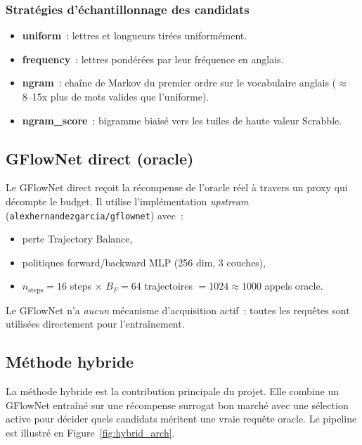 \documentclass[10pt]{article}
\begin{document}
\subsubsection{Stratégies d'échantillonnage des candidats}

\begin{itemize}[noitemsep]
  \item \textbf{uniform}~: lettres et longueurs tirées uniformément.
  \item \textbf{frequency}~: lettres pondérées par leur fréquence en anglais.
  \item \textbf{ngram}~: chaîne de Markov du premier ordre sur le vocabulaire anglais ($\approx$ 8–15x plus de mots valides que l'uniforme).
  \item \textbf{ngram\_score}~: bigramme biaisé vers les tuiles de haute valeur Scrabble.
\end{itemize}

\subsection{GFlowNet direct (oracle)}

Le GFlowNet direct reçoit la récompense de l'oracle réel à travers un proxy qui décompte le budget. Il utilise l'implémentation \emph{upstream} (\texttt{alexhernandezgarcia/gflownet}) avec~:
\begin{itemize}[noitemsep]
  \item perte Trajectory Balance,
  \item politiques forward/backward MLP (256 dim, 3 couches),
  \item $n_{\text{steps}} = 16$ steps $\times$ $B_F = 64$ trajectoires $= 1024 \approx 1000$ appels oracle.
\end{itemize}

Le GFlowNet n'a \emph{aucun} mécanisme d'acquisition actif~: toutes les requêtes sont utilisées directement pour l'entraînement.

\subsection{Méthode hybride}

La méthode hybride est la contribution principale du projet. Elle combine un GFlowNet entraîné sur une récompense surrogat bon marché avec une sélection active pour décider quels candidats méritent une vraie requête oracle. Le pipeline est illustré en Figure~\ref{fig:hybrid_arch}.
\end{document}
